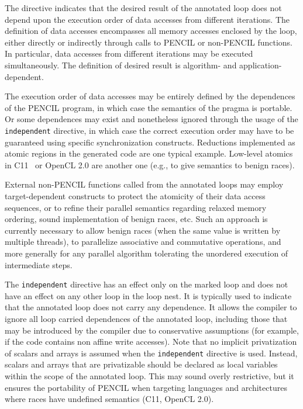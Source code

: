 
The directive indicates that the desired result of the annotated
loop does not depend upon the execution order of data accesses
from different iterations.  The definition of data accesses
encompasses all memory accesses enclosed by the loop, either directly
or indirectly through calls to PENCIL or non-PENCIL functions. In
particular, data accesses from different iterations may be executed
simultaneously. The definition of desired result is algorithm- and
application-dependent.

The execution order of data accesses may be entirely defined by
the dependences of the PENCIL program, in which case the semantics of
the pragma is portable. Or some dependences may exist and nonetheless
ignored through the usage of the \lstinline!independent! directive,
in which case the correct execution order may have to be guaranteed
using specific synchronization constructs.
Reductions implemented as atomic regions in the generated code are one
typical example. Low-level atomics in C11~\cite{c11} or OpenCL 2.0 are another one
(e.g., to give semantics to benign races).

External non-PENCIL functions called from the annotated loops
may employ target-dependent constructs to protect the atomicity of
their data access sequences, or to refine their parallel semantics
regarding relaxed memory ordering, sound implementation of benign
races, etc.
Such an approach is
currently necessary to allow benign races (when the same value is
written by multiple threads), to parallelize associative and commutative
operations, and more generally for any parallel algorithm tolerating
the unordered execution of intermediate steps.

The \lstinline!independent! directive has an effect only on the marked loop
and does not have an effect on any other loop in the loop nest.
It is typically used to indicate
that the annotated loop does not carry any dependence.  It allows the
compiler to ignore all loop carried dependences of the annotated loop,
including those that may be introduced by the compiler due to
conservative assumptions (for example, if the code contains non affine
write accesses).
Note that no implicit privatization of scalars and arrays is assumed when
the \lstinline!independent! directive is used.  Instead, scalars and
arrays that are privatizable should be declared as local variables
within the scope of the annotated loop.
This may sound overly restrictive, but it ensures the portability of
PENCIL when targeting languages and architectures where races have
undefined semantics (C11, OpenCL 2.0).

